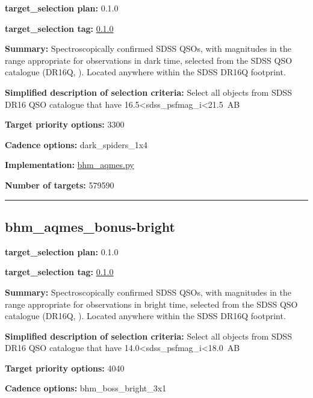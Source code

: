 \noindent\textbf{target\_selection plan:} 0.1.0

\noindent\textbf{target\_selection tag:}
\href{https://github.com/sdss/target_selection/tree/0.1.0/}{0.1.0}

\noindent\textbf{Summary:} Spectroscopically confirmed SDSS QSOs, with magnitudes
in the range appropriate for observations in dark time, selected from
the SDSS QSO catalogue (DR16Q,
\citealt{Lyke2020}). Located anywhere within the SDSS DR16Q footprint.

\noindent\textbf{Simplified description of selection criteria:} Select all
objects from SDSS DR16 QSO catalogue that have
16.5\textless sdss\_psfmag\_i\textless21.5~AB


\noindent\textbf{Target priority options:} 3300

\noindent\textbf{Cadence options:} dark\_spiders\_1x4

\noindent\textbf{Implementation:}
\href{https://github.com/sdss/target_selection/blob/0.1.0/python/target_selection/cartons/bhm_aqmes.py}{bhm\_aqmes.py}

\noindent\textbf{Number of targets:} 579590

\begin{center}\rule{0.5\linewidth}{0.5pt}\end{center}

\hypertarget{bhm_aqmes_bonus-bright_plan0.1.0}{%
\subsection{bhm\_aqmes\_bonus-bright}\label{bhm_aqmes_bonus-bright_plan0.1.0}}

\noindent\textbf{target\_selection plan:} 0.1.0

\noindent\textbf{target\_selection tag:}
\href{https://github.com/sdss/target_selection/tree/0.1.0/}{0.1.0}

\noindent\textbf{Summary:} Spectroscopically confirmed SDSS QSOs, with magnitudes
in the range appropriate for observations in bright time, selected from
the SDSS QSO catalogue (DR16Q,
\citealt{Lyke2020}). Located anywhere within the SDSS DR16Q footprint.

\noindent\textbf{Simplified description of selection criteria:} Select all
objects from SDSS DR16 QSO catalogue that have
14.0\textless sdss\_psfmag\_i\textless18.0~AB


\noindent\textbf{Target priority options:} 4040

\noindent\textbf{Cadence options:} bhm\_boss\_bright\_3x1

